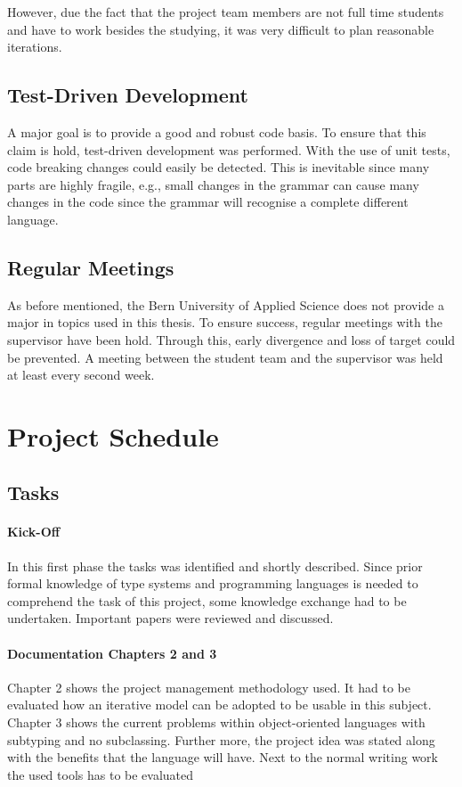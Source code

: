 However, due the fact that the project team members are not full time
students and have to work besides the studying, it was very difficult
to plan reasonable iterations.

\subsection{Test-Driven Development}
A major goal is to provide a good and robust code basis. To ensure that
this claim is hold, test-driven development was performed. With the use of
unit tests, code breaking changes could easily be detected. This is inevitable
since many parts are highly fragile, e.g., small changes in the grammar can
cause many changes in the code since the grammar will recognise a complete
different language.

\subsection{Regular Meetings}
As before mentioned, the Bern University of Applied Science does not provide a major in
topics used in this thesis. To ensure success, regular meetings with the
supervisor have been hold. Through this, early divergence and loss of target could
be prevented. A meeting between the student team and the supervisor
was held at least every second week.

\section{Project Schedule}
\subsection{Tasks}
\paragraph{Kick-Off}
In this first phase the tasks was identified and shortly
described. Since prior formal knowledge of type systems and programming
languages is needed to comprehend the task of this project, some
knowledge exchange had to be undertaken. Important papers were reviewed
and discussed.

\paragraph{Documentation Chapters 2 and 3}
Chapter 2 shows the project management methodology used. It had to be
evaluated how an iterative model can be adopted to be usable in this
subject. Chapter 3 shows the current problems within object-oriented
languages with subtyping and no subclassing. Further more, the project idea
was stated along with the benefits that the language will have. Next
to the normal writing work the used tools has to be evaluated

